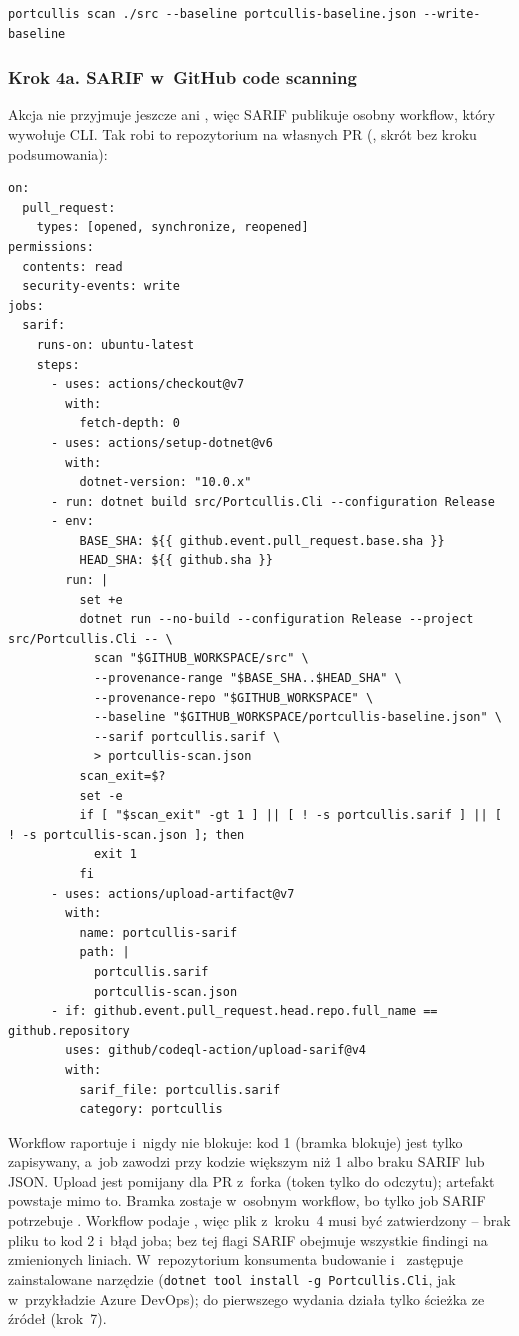 \begin{lstlisting}
portcullis scan ./src --baseline portcullis-baseline.json --write-baseline
\end{lstlisting}

\subsubsection{Krok 4a. SARIF w~GitHub code scanning}\label{sec:portcullis-tutorial-sarif}

Akcja nie przyjmuje jeszcze  ani , więc SARIF
publikuje osobny workflow, który wywołuje CLI. Tak robi to repozytorium na własnych PR
(, skrót bez kroku podsumowania):

\begin{lstlisting}
on:
  pull_request:
    types: [opened, synchronize, reopened]
permissions:
  contents: read
  security-events: write
jobs:
  sarif:
    runs-on: ubuntu-latest
    steps:
      - uses: actions/checkout@v7
        with:
          fetch-depth: 0
      - uses: actions/setup-dotnet@v6
        with:
          dotnet-version: "10.0.x"
      - run: dotnet build src/Portcullis.Cli --configuration Release
      - env:
          BASE_SHA: ${{ github.event.pull_request.base.sha }}
          HEAD_SHA: ${{ github.sha }}
        run: |
          set +e
          dotnet run --no-build --configuration Release --project src/Portcullis.Cli -- \
            scan "$GITHUB_WORKSPACE/src" \
            --provenance-range "$BASE_SHA..$HEAD_SHA" \
            --provenance-repo "$GITHUB_WORKSPACE" \
            --baseline "$GITHUB_WORKSPACE/portcullis-baseline.json" \
            --sarif portcullis.sarif \
            > portcullis-scan.json
          scan_exit=$?
          set -e
          if [ "$scan_exit" -gt 1 ] || [ ! -s portcullis.sarif ] || [ ! -s portcullis-scan.json ]; then
            exit 1
          fi
      - uses: actions/upload-artifact@v7
        with:
          name: portcullis-sarif
          path: |
            portcullis.sarif
            portcullis-scan.json
      - if: github.event.pull_request.head.repo.full_name == github.repository
        uses: github/codeql-action/upload-sarif@v4
        with:
          sarif_file: portcullis.sarif
          category: portcullis
\end{lstlisting}

Workflow raportuje i~nigdy nie blokuje: kod 1 (bramka blokuje) jest tylko zapisywany, a~job
zawodzi przy kodzie większym niż 1 albo braku SARIF lub JSON. Upload jest pomijany dla PR
z~forka (token tylko do odczytu); artefakt powstaje mimo to. Bramka zostaje w~osobnym
workflow, bo tylko job SARIF potrzebuje . Workflow podaje
, więc plik z~kroku~4 musi być zatwierdzony -- brak pliku to kod 2
i~błąd joba; bez tej flagi SARIF obejmuje wszystkie findingi na zmienionych liniach.
W~repozytorium konsumenta budowanie i~\repopath{dotnet run} zastępuje zainstalowane narzędzie
\repopath{portcullis} (\texttt{dotnet tool install -g Portcullis.Cli}, jak w~przykładzie
Azure DevOps); do pierwszego wydania działa tylko ścieżka ze źródeł (krok~7).

